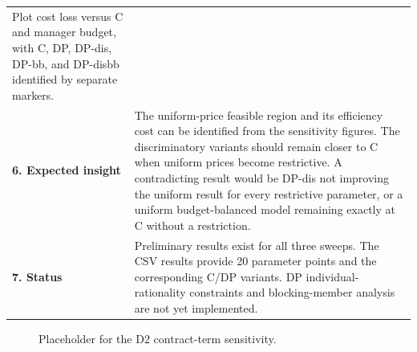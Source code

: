 \documentclass[]{article}
\begin{document}
\begin{longtable}[]{@{}
>{\raggedright\arraybackslash}p{}
>{\raggedright\arraybackslash}p{}@{}}
Plot cost loss versus C and manager budget, with C, DP, DP-dis,
DP-bb, and DP-disbb identified by separate markers. \\
\textbf{6. Expected insight} &
The uniform-price feasible region and its efficiency cost can be identified
from the sensitivity figures. The discriminatory variants should remain
closer to C when uniform prices become restrictive.
A contradicting result would be DP-dis not improving the uniform result
for every restrictive parameter, or a uniform budget-balanced model
remaining exactly at C without a restriction. \\
\textbf{7. Status} &
Preliminary results exist for all three sweeps. The CSV results
provide 20 parameter points and the corresponding C/DP variants.
DP individual-rationality constraints and blocking-member analysis
are not yet implemented. \\
\bottomrule
\end{longtable}

\begin{figure}[htbp]
\centering
{}
\caption{Placeholder for the D2 contract-term sensitivity.}
\label{fig:d2_placeholder}
\end{figure}
\end{document}
